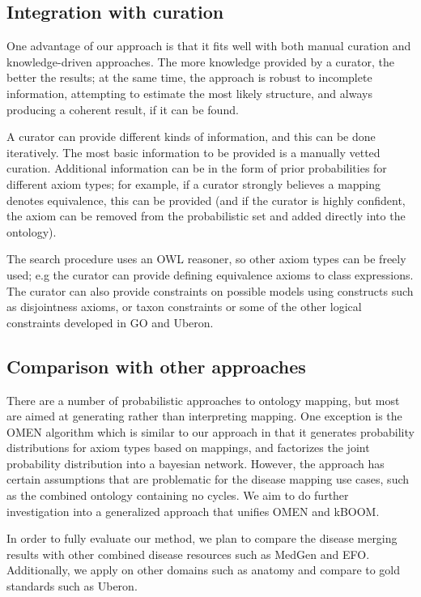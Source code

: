 \documentclass{my}
\begin{document}
\subsection{Integration with curation}

One advantage of our approach is that it fits well with both manual
curation and knowledge-driven approaches. The more knowledge provided
by a curator, the better the results; at the same time, the approach
is robust to incomplete information, attempting to estimate the most
likely structure, and always producing a coherent result, if it can be
found.

A curator can provide different kinds of information, and this can be
done iteratively. The most basic information to be provided is a
manually vetted curation. Additional information can be in the form of
prior probabilities for different axiom types; for example, if a
curator strongly believes a mapping denotes equivalence, this can be
provided (and if the curator is highly confident, the axiom can be
removed from the probabilistic set and added directly into the
ontology).

The search procedure uses an OWL reasoner, so other axiom types can be
freely used; e.g the curator can provide defining equivalence axioms
to class expressions. The curator can also provide constraints on
possible models using constructs such as disjointness axioms, or taxon
constraints or some of the other logical constraints developed in
GO\cite{Mungall2014} and Uberon.

\subsection{Comparison with other approaches}

There are a number of probabilistic approaches to ontology mapping,
but most are aimed at generating rather than interpreting mapping. One
exception is the OMEN algorithm\cite{Mitra2005} which is similar to
our approach in that it generates probability distributions for axiom
types based on mappings, and factorizes the joint probability
distribution into a bayesian network. However, the approach has
certain assumptions that are problematic for the disease mapping use
cases, such as the combined ontology containing no cycles. We aim to
do further investigation into a generalized approach that unifies OMEN
and kBOOM.

In order to fully evaluate our method, we plan to compare the disease
merging results with other combined disease resources such as MedGen
and EFO\cite{malone2010modeling}. Additionally, we apply on other
domains such as anatomy and compare to gold standards such as Uberon.







\end{document}
